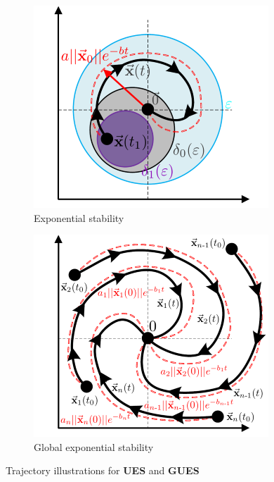 \begin{figure}[hbtp]
\centering
\begin{subfigure}{0.49\textwidth}
\includegraphics[width=\textwidth]{figs/exponential-stability}
\vspace{-14pt}
\caption{Exponential stability}
\label{fig:exponential-stability}
\end{subfigure}
\begin{subfigure}{0.49\textwidth}
\centering
\includegraphics[width=\textwidth]{figs/global-exponential-stability}
\vspace{-14pt}
\caption{Global exponential stability}
\label{fig:global-exponential-stability}
\end{subfigure}
\vspace{-2pt}
\caption{Trajectory illustrations for \textbf{UES} and \textbf{GUES}}
\vspace{-6pt}
\end{figure}
